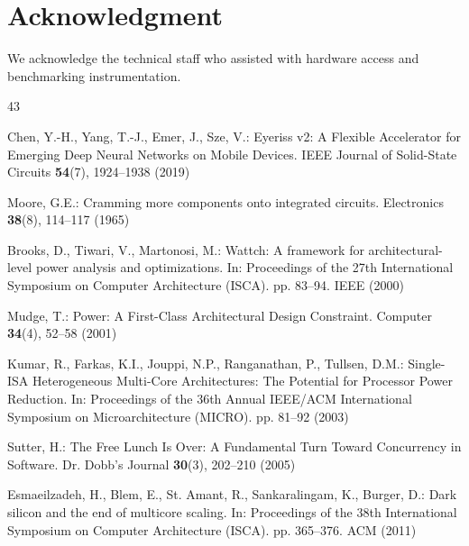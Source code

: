 \documentclass[conference]{IEEEtran}
\begin{document}
\section*{Acknowledgment}
We acknowledge the technical staff who assisted with hardware access and benchmarking instrumentation.

\begin{thebibliography}{43}

Chen, Y.-H., Yang, T.-J., Emer, J., Sze, V.: Eyeriss v2: A Flexible Accelerator for Emerging Deep Neural Networks on Mobile Devices. IEEE Journal of Solid-State Circuits \textbf{54}(7), 1924--1938 (2019)


Moore, G.E.: Cramming more components onto integrated circuits. Electronics \textbf{38}(8), 114--117 (1965)


Brooks, D., Tiwari, V., Martonosi, M.: Wattch: A framework for architectural-level power analysis and optimizations. In: Proceedings of the 27th International Symposium on Computer Architecture (ISCA). pp. 83--94. IEEE (2000)


Mudge, T.: Power: A First-Class Architectural Design Constraint. Computer \textbf{34}(4), 52--58 (2001)


Kumar, R., Farkas, K.I., Jouppi, N.P., Ranganathan, P., Tullsen, D.M.: Single-ISA Heterogeneous Multi-Core Architectures: The Potential for Processor Power Reduction. In: Proceedings of the 36th Annual IEEE/ACM International Symposium on Microarchitecture (MICRO). pp. 81--92 (2003)


Sutter, H.: The Free Lunch Is Over: A Fundamental Turn Toward Concurrency in Software. Dr. Dobb's Journal \textbf{30}(3), 202--210 (2005)


Esmaeilzadeh, H., Blem, E., St. Amant, R., Sankaralingam, K., Burger, D.: Dark silicon and the end of multicore scaling. In: Proceedings of the 38th International Symposium on Computer Architecture (ISCA). pp. 365--376. ACM (2011)



\end{thebibliography}
\end{document}
